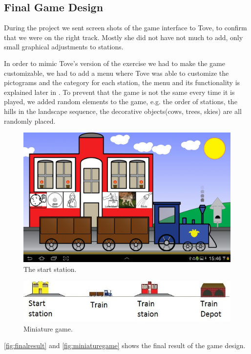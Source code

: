 \subsection{Final Game Design}\label{sec:finalgame}
\label{designgameinterface}
During the project we sent screen shots of the game interface to Tove, to confirm that we were on the right track. Mostly she did not have not much to add, only small graphical adjustments to stations.

In order to mimic Tove's version of the exercise we had to make the game customizable, we had to add a menu where Tove was able to customize the pictograms and the category for each station, the menu and its functionality is explained later in . To prevent that the game is not the same every time it is played, we added random elements to the game, e.g. the order of stations, the hills in the landscape sequence, the decorative objects(cows, trees, skies) are all randomly placed.
\begin{figure}[H]
\centering
\includegraphics[width=0.9\linewidth]{img/screenshots/gamedesign1.jpg}%
\caption{The start station.}
\label{fig:finalresult}
\end{figure}
\begin{figure}[H]
\centering
\includegraphics[width=1.0\linewidth]{img/screenshots/stations.jpg}
\caption{Miniature game.}
\label{fig:miniaturegame}
\end{figure}
\autoref{fig:finalresult} and \autoref{fig:miniaturegame} shows the final result of the game design.
